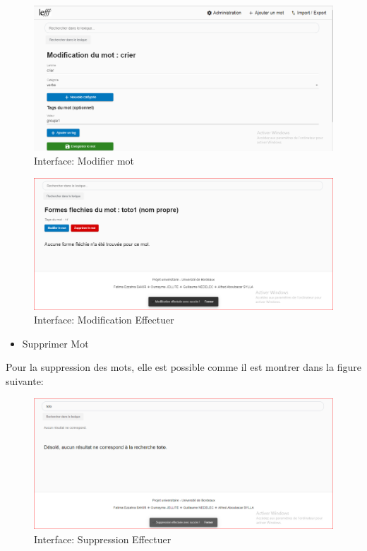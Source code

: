 \documentclass[12pt,a4paper]{article}
\begin{document}
\begin{figure}[!b]
\centering
\includegraphics{img/ModificationMot.PNG}
\caption{Interface: Modifier mot}
\label{Tux}
\end{figure}

\begin{figure}[!b]
\centering
\includegraphics{img/ModificationEffectuer.PNG}
\caption{Interface: Modification Effectuer}
\label{Tux}
\end{figure}



\begin{itemize}  
  \item Supprimer Mot
\end{itemize}
Pour la suppression des mots, elle est possible comme il est montrer dans la figure suivante:

\begin{figure}[!b]
\centering
\includegraphics{img/SuppressionEffectuer.PNG}
\caption{Interface: Suppression Effectuer}
\label{Tux}
\end{figure}
\end{document}
